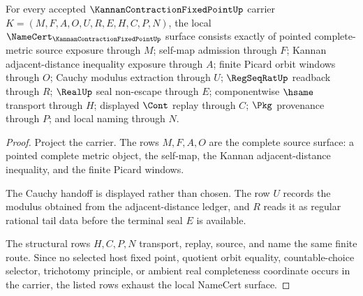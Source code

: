 \begin{theorem}
\label{thm:kannan-contraction-fixed-point-namecert-obligations}
For every accepted $\KannanContractionFixedPointUp$ carrier $K=(M,F,A,O,U,R,E,H,C,P,N)$, the local $\NameCert_{\KannanContractionFixedPointUp}$ surface consists exactly of pointed complete-metric source exposure through $M$; self-map admission through $F$; Kannan adjacent-distance inequality exposure through $A$; finite Picard orbit windows through $O$; Cauchy modulus extraction through $U$; $\RegSeqRatUp$ readback through $R$; $\RealUp$ seal non-escape through $E$; componentwise $\hsame$ transport through $H$; displayed $\Cont$ replay through $C$; $\Pkg$ provenance through $P$; and local naming through $N$.
\end{theorem}
\begin{proof}
Project the carrier. The rows $M,F,A,O$ are the complete source surface: a pointed complete metric object, the self-map, the Kannan adjacent-distance inequality, and the finite Picard windows.

The Cauchy handoff is displayed rather than chosen. The row $U$ records the modulus obtained from the adjacent-distance ledger, and $R$ reads it as regular rational tail data before the terminal seal $E$ is available.

The structural rows $H,C,P,N$ transport, replay, source, and name the same finite route. Since no selected host fixed point, quotient orbit equality, countable-choice selector, trichotomy principle, or ambient real completeness coordinate occurs in the carrier, the listed rows exhaust the local NameCert surface.
\end{proof}

